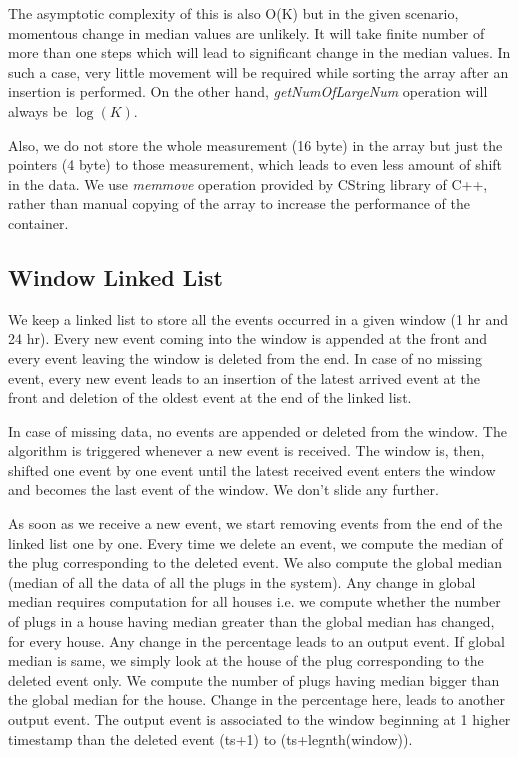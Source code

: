 The asymptotic complexity of this is also O(K) but in the given scenario, momentous change in median values are unlikely. It will take finite number of more than one steps which will lead to significant change in the median values. In such a case, very little movement will be required while sorting the array after an insertion is performed. On the other hand, \textit{getNumOfLargeNum} operation will always be $\log(K)$.

Also, we do not store the whole measurement (16 byte) in the array but just the pointers (4 byte) to those measurement, which leads to even less amount of shift in the data. We use \textit{memmove} operation provided by CString library of C++, rather than manual copying of the array to increase the performance of the container.

\subsection{Window Linked List}
We keep a linked list to store all the events occurred in a given window (1 hr and 24 hr). Every new event coming into the window is appended at the front and every event leaving the window is deleted from the end. In case of no missing event, every new event leads to an insertion of the latest arrived event at the front and deletion of the oldest event at the end of the linked list.


 In case of missing data, no events are appended or deleted from the window. The algorithm is triggered whenever a new event is received. The window is, then, shifted one event by one event until the latest received event enters the window and becomes the last event of the window. We don't slide any further.

As soon as we receive a new event, we start removing events from the end of the linked list one by one. Every time we delete an event, we compute the median of the plug corresponding to the deleted event. We also compute the global median (median of all the data of all the plugs in the system). Any change in global median requires computation for all houses i.e. we compute whether the number of plugs in a house having median greater than the global median has changed, for every house. Any change in the percentage leads to an output event. If global median is same, we simply look at the house of the plug corresponding to the deleted event only. We compute the number of plugs having median bigger than the global median for the house. Change in the percentage here, leads to another output event. The output event is associated to the window beginning at 1 higher timestamp than the deleted event (ts+1) to (ts+legnth(window)).


